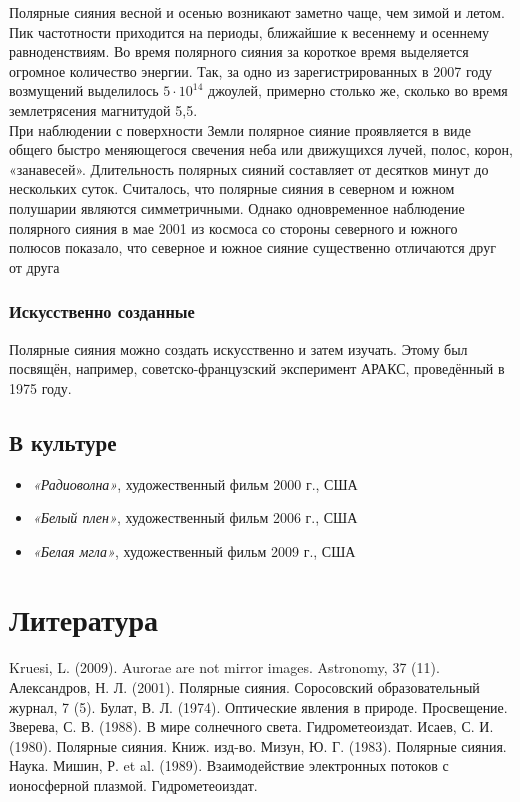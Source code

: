 \documentclass[a4paper,14pt]{article}
\begin{document}
\indent Полярные сияния весной и осенью возникают заметно чаще, чем зимой и летом. Пик частотности приходится на периоды, ближайшие к 
весеннему и осеннему равноденствиям. Во время полярного сияния за короткое время выделяется огромное количество энергии. Так, за одно из 
зарегистрированных в 2007 году возмущений выделилось $5\cdot10^{14}$ джоулей, примерно столько же, сколько во время землетрясения
 магнитудой 5,5. \\
\indent При наблюдении с поверхности Земли полярное сияние проявляется в виде общего быстро меняющегося свечения неба или движущихся лучей,
полос, корон, «занавесей». Длительность полярных сияний составляет от десятков минут до нескольких суток. Считалось, что полярные
сияния в северном и южном полушарии являются симметричными. Однако одновременное наблюдение полярного сияния в мае 2001 из космоса
со стороны северного и южного полюсов показало, что северное и южное сияние существенно отличаются друг от друга

\subsubsection{Искусственно созданные}
Полярные сияния можно создать искусственно и затем изучать. Этому был посвящён, например, советско-французский эксперимент АРАКС,
проведённый в 1975 году.

\subsection{В культуре}
\begin{itemize}
 \item[\textcolor{blue}{\textbullet}]{\textit{«Радиоволна»}, художественный фильм 2000 г., США}
 \item[\textcolor{blue}{\textbullet}]{\textit{«Белый плен»}, художественный фильм 2006 г., США}
 \item[\textcolor{blue}{\textbullet}]{\textit{«Белая мгла»}, художественный фильм 2009 г., США}
\end{itemize}

\printbibliography


\section{Литература}
Kruesi, L. (2009). Aurorae are not mirror images. Astronomy, 37 (11).
Александров, Н. Л. (2001). Полярные сияния. Соросовский образовательный журнал, 7 (5).
Булат, В. Л. (1974). Оптические явления в природе. Просвещение.
Зверева, С. В. (1988). В мире солнечного света. Гидрометеоиздат.
Исаев, С. И. (1980). Полярные сияния. Книж. изд-во.
Мизун, Ю. Г. (1983). Полярные сияния. Наука.
Мишин, Р. et al. (1989). Взаимодействие электронных потоков с ионосферной плазмой. Гидрометеоиздат.
\end{document}
